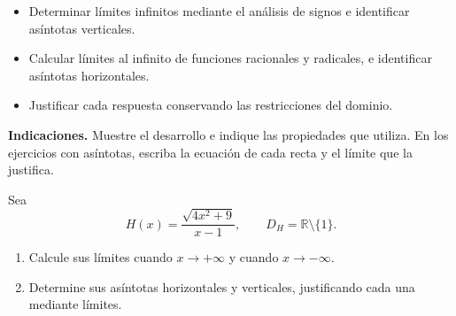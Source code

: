 \documentclass[10pt,a5paper]{article}
\newif\ifmostrarSoluciones
\newenvironment{solucionejercicio}[1]{%
  \par\medskip\noindent\textbf{Solución del ejercicio #1.}%
  \enspace\ignorespaces
}{%
  \par\medskip
}
\begin{document}

\begin{objetivos}
\begin{itemize}
  \item Determinar límites infinitos mediante el análisis de signos e identificar asíntotas verticales.
  \item Calcular límites al infinito de funciones racionales y radicales, e identificar asíntotas horizontales.
  \item Justificar cada respuesta conservando las restricciones del dominio.
\end{itemize}
\end{objetivos}

\noindent\textbf{Indicaciones.} Muestre el desarrollo e indique las propiedades que utiliza. En los ejercicios con asíntotas, escriba la ecuación de cada recta y el límite que la justifica.

\begin{ejerciciopractica}
  Sea
  \[
    H(x)=\frac{\sqrt{4x^2+9}}{x-1},
    \qquad D_H=\mathbb{R}\setminus\{1\}.
  \]
  \begin{enumerate}
    \item Calcule sus límites cuando $x\to+\infty$ y cuando $x\to-\infty$.
    \item Determine sus asíntotas horizontales y verticales, justificando cada una mediante límites.
  \end{enumerate}
\end{ejerciciopractica}

\ifmostrarSoluciones
\begin{solucionejercicio}{1}
  Para $x\neq0$,
  \[
    \sqrt{4x^2+9}=|x|\sqrt{4+9/x^2}.
  \]
  Si $x\to+\infty$, se tiene $|x|=x$, de modo que
  \[
    H(x)=\frac{\sqrt{4+9/x^2}}{1-1/x}\longrightarrow2.
  \]
  Si $x\to-\infty$, se tiene $|x|=-x$, por lo que
  \[
    H(x)=-\frac{\sqrt{4+9/x^2}}{1-1/x}\longrightarrow-2.
  \]
  Las asíntotas horizontales son $y=2$ hacia $+\infty$ y $y=-2$ hacia $-\infty$.

  Cerca de $1$, el numerador es positivo y tiende a $\sqrt{13}$. El denominador tiende a $0$ con el signo de $x-1$. Así,
  \[
    \lim_{x\to1^-}H(x)=-\infty,
    \qquad \lim_{x\to1^+}H(x)=+\infty.
  \]
  La única asíntota vertical es $x=1$: el radicando es siempre positivo y el denominador no se anula en ningún otro punto.
\end{solucionejercicio}
\fi
\end{document}
